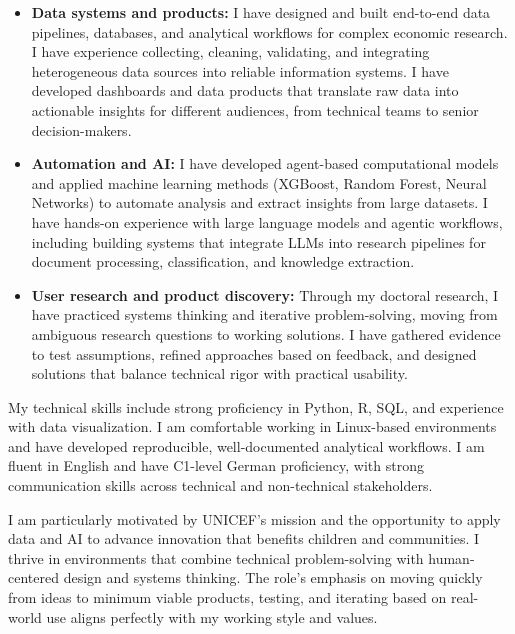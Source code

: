\documentclass[11pt]{article}
\begin{document}
\begin{itemize}
    \item \textbf{Data systems and products:} I have designed and built end-to-end data pipelines, databases, and analytical workflows for complex economic research. I have experience collecting, cleaning, validating, and integrating heterogeneous data sources into reliable information systems. I have developed dashboards and data products that translate raw data into actionable insights for different audiences, from technical teams to senior decision-makers.
    \item \textbf{Automation and AI:} I have developed agent-based computational models and applied machine learning methods (XGBoost, Random Forest, Neural Networks) to automate analysis and extract insights from large datasets. I have hands-on experience with large language models and agentic workflows, including building systems that integrate LLMs into research pipelines for document processing, classification, and knowledge extraction.
    \item \textbf{User research and product discovery:} Through my doctoral research, I have practiced systems thinking and iterative problem-solving, moving from ambiguous research questions to working solutions. I have gathered evidence to test assumptions, refined approaches based on feedback, and designed solutions that balance technical rigor with practical usability.
\end{itemize}

My technical skills include strong proficiency in Python, R, SQL, and experience with data visualization. I am comfortable working in Linux-based environments and have developed reproducible, well-documented analytical workflows. I am fluent in English and have C1-level German proficiency, with strong communication skills across technical and non-technical stakeholders.

I am particularly motivated by UNICEF's mission and the opportunity to apply data and AI to advance innovation that benefits children and communities. I thrive in environments that combine technical problem-solving with human-centered design and systems thinking. The role's emphasis on moving quickly from ideas to minimum viable products, testing, and iterating based on real-world use aligns perfectly with my working style and values.
\end{document}
